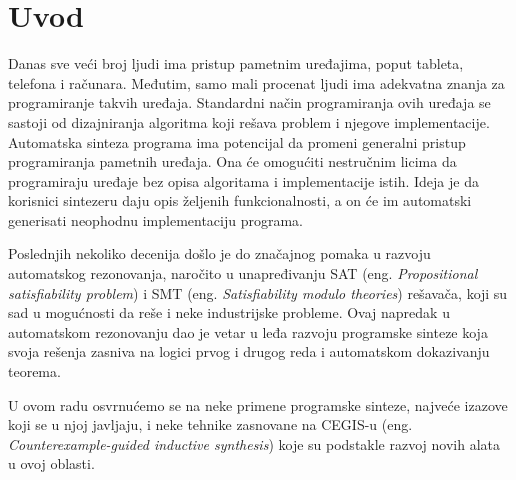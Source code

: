 
\section{Uvod}
\label{sec:uvod}

Danas sve veći broj ljudi ima pristup pametnim uređajima, poput tableta, telefona i računara. Međutim, samo mali procenat ljudi ima adekvatna znanja za programiranje takvih uređaja. Standardni način programiranja ovih uređaja se sastoji od dizajniranja algoritma koji rešava problem i njegove implementacije. Automatska sinteza programa ima potencijal da promeni generalni pristup programiranja pametnih uređaja. Ona će omogućiti nestručnim licima da programiraju uređaje bez opisa algoritama i implementacije istih. Ideja je da korisnici sintezeru daju opis željenih funkcionalnosti, a on će im automatski generisati neophodnu implementaciju programa.

Poslednjih nekoliko decenija došlo je do značajnog pomaka u razvoju automatskog rezonovanja, naročito u unapređivanju SAT (eng. \emph{Propositional satisfiability problem}) i SMT (eng. \emph{Satisfiability modulo theories}) rešavača, koji su sad u mogućnosti da reše i neke industrijske probleme. Ovaj napredak u automatskom rezonovanju dao je vetar u leđa razvoju programske sinteze koja svoja rešenja zasniva na logici prvog i drugog reda i automatskom dokazivanju teorema.

U ovom radu osvrnućemo se na neke primene programske sinteze, najveće izazove koji se u njoj javljaju, i neke tehnike zasnovane na CEGIS-u (eng. \emph{Counterexample-guided inductive synthesis}) koje su podstakle razvoj novih alata u ovoj oblasti.

 

